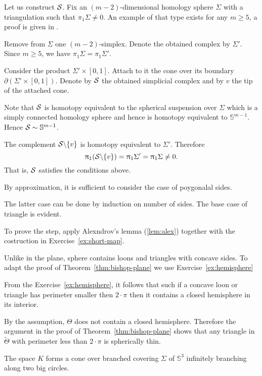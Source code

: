 Let us construct $\mathcal{S}$.
Fix an $(m-2)$-dimensional homology sphere $\Sigma$ with a triangulation such that $\pi_1\Sigma\ne0$.
An example of that type exists for any $m\ge 5$, a proof is given in \cite{kervaire}.

Remove from $\Sigma$ one $(m-2)$-simplex.
Denote the obtained complex by $\Sigma'$.
Since $m\ge 5$, we have $\pi_1\Sigma=\pi_1\Sigma'$.

Consider the product $\Sigma'\times [0,1]$. 
Attach to it the cone over its boundary $\partial (\Sigma'\times [0,1])$.
Denote by $\mathcal{S}$ the obtained simplicial complex
and by $v$ the tip of the attached cone.

Note that $\mathcal{S}$ is homotopy equivalent to the spherical suspension over $\Sigma$ which is a simply connected homology sphere and hence is homotopy equivalent to $\mathbb{S}^{m-1}$.
  Hence  $\mathcal{S}\sim\mathbb{S}^{m-1}$.

The complement $\mathcal{S}\backslash\{v\}$ is homotopy equivalent to $\Sigma'$.
Therefore 
\[
\uppi_1(\mathcal{S}\backslash\{v\})
=\uppi_1\Sigma'
=\uppi_1\Sigma\ne 0.
\]
That is, $\mathcal{S}$ satisfies the conditions above.
\qeds

By approximation,
it is sufficient to consider the case of poygonalal sides.

The latter case can be done by induction on number of sides.
The base case of triangle is evident.

To prove the step, apply Alexndrov's lemma (\ref{lem:alex}) 
together with the costruction in Exercise~\ref{ex:short-map}.
\qeds

Unlike in the plane, sphere contains loons and triangles with concave sides.
To adapt the proof of Theorem~\ref{thm:bishop-plane}
we use Exercise~\ref{ex:hemisphere}

From the Exercise~\ref{ex:hemisphere}, it follows that such if a concave loon or triangle has perimeter smaller then $2\cdot\pi$ then it contains a closed hemisphere in its interior.

By the assumption, $\Theta$ does not contain a closed hemisphere. 
Therefore the argument in the proof of Theorem~\ref{thm:bishop-plane} shows that any triangle in $\tilde\Theta$ with perimeter less than $2\cdot\pi$ is spherically thin. 
\qeds


The space $K$ forms a cone over branched covering $\Sigma$ of $\mathbb{S}^3$ infinitely branching along two big circles.

